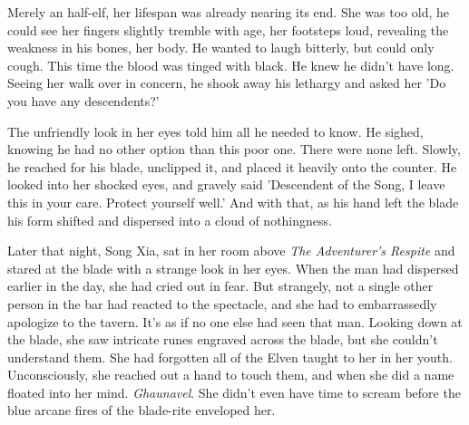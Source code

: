 \documentclass[12pt]{article}
\begin{document}
Merely an half-elf, her lifespan was already nearing its end. She was too old,
he could see her fingers slightly tremble with age, her footsteps loud,
revealing the weakness in his bones, her body. He wanted to laugh bitterly, but
could only cough. This time the blood was tinged with black. He knew he didn't
have long. Seeing her walk over in concern, he shook away his lethargy and asked
her 'Do you have any descendents?' 

The unfriendly look in her eyes told him all he needed to know. He sighed,
knowing he had no other option than this poor one. There were none left. Slowly,
he reached for his blade, unclipped it, and placed it heavily onto the counter.
He looked into her shocked eyes, and gravely said 'Descendent of the Song,
I leave this in your care. Protect yourself well.' And with that, as his hand
left the blade his form shifted and dispersed into a cloud of nothingness.

Later that night, Song Xia, sat in her room above {\em The Adventurer's Respite}
and stared at the blade with a strange look in her eyes. When the man had
dispersed earlier in the day, she had cried out in fear. But strangely, not
a single other person in the bar had reacted to the spectacle, and she had to
embarrassedly apologize to the tavern. It's as if no one else had seen that man.
Looking down at the blade, she saw intricate runes engraved across the blade,
but she couldn't understand them. She had forgotten all of the Elven taught to
her in her youth. Unconsciously, she reached out a hand to touch them, and when
she did a name floated into her mind. {\em Ghaunavel}. She didn't even have time
to scream before the blue arcane fires of the blade-rite enveloped her.
\end{document}

